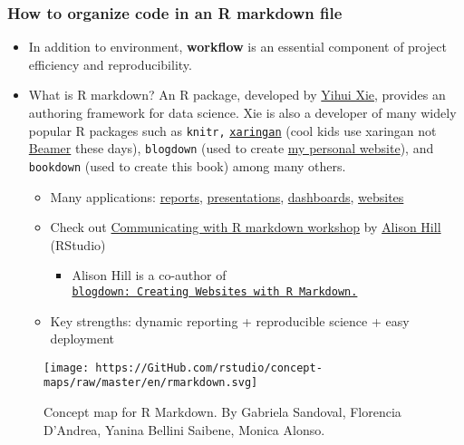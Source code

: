 \documentclass[
]{book}
\providecommand{\tightlist}{%
  \setlength{\itemsep}{0pt}\setlength{\parskip}{0pt}}
\begin{document}
\hypertarget{how-to-organize-code-in-an-r-markdown-file}{%
\subsubsection{How to organize code in an R markdown file}\label{how-to-organize-code-in-an-r-markdown-file}}

\begin{itemize}
\item
  In addition to environment, \textbf{workflow} is an essential component of project efficiency and reproducibility.
\item
  What is R markdown? An R package, developed by \href{https://yihui.org/en/}{Yihui Xie}, provides an authoring framework for data science. Xie is also a developer of many widely popular R packages such as \texttt{knitr,} \href{https://GitHub.com/yihui/xaringan}{\texttt{xaringan}} (cool kids use xaringan not \href{https://en.wikipedia.org/wiki/Beamer_(LaTeX)}{Beamer} these days), \texttt{blogdown} (used to create \href{https://jaeyk.GitHub.io/}{my personal website}), and \texttt{bookdown} (used to create this book) among many others.

  \begin{itemize}
  \tightlist
  \item
    Many applications: \href{https://rstudio.GitHub.io/distill/basics.html}{reports}, \href{https://bookdown.org/yihui/rmarkdown/xaringan.html}{presentations}, \href{https://rmarkdown.rstudio.com/flexdashboard/}{dashboards}, \href{https://bookdown.org/yihui/rmarkdown/websites.html}{websites}\\
  \item
    Check out \href{https://ysc-rmarkdown.netlify.app/}{Communicating with R markdown workshop} by \href{https://alison.rbind.io/}{Alison Hill} (RStudio)

    \begin{itemize}
    \tightlist
    \item
      Alison Hill is a co-author of \href{https://bookdown.org/yihui/blogdown/}{\texttt{blogdown:\ Creating\ Websites\ with\ R\ Markdown.}}
    \end{itemize}
  \item
    Key strengths: dynamic reporting + reproducible science + easy deployment
  \end{itemize}
\end{itemize}

\begin{figure}
\centering
\texttt{[image: https://GitHub.com/rstudio/concept-maps/raw/master/en/rmarkdown.svg]}
\caption{Concept map for R Markdown. By Gabriela Sandoval, Florencia D'Andrea, Yanina Bellini Saibene, Monica Alonso.}
\end{figure}
\end{document}
